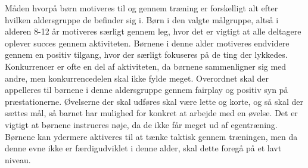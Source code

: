 Måden hvorpå børn motiveres til og gennem træning er forskelligt alt efter hvilken aldersgruppe de befinder sig i. Børn i den valgte målgruppe, altså i alderen 8-12 år motiveres særligt gennem leg, hvor det er vigtigt at alle deltagere oplever succes gennem aktiviteten. Børnene i denne alder motiveres endvidere gennem en positiv tilgang, hvor der særligt fokuseres på de ting der lykkedes. Konkurrencer er ofte en del af aktiviteten, da børnene sammenligner sig med andre, men konkurrencedelen skal ikke fylde meget. Overordnet skal der appelleres til børnene i denne aldersgruppe gennem fairplay og positiv syn på præstationerne. Øvelserne der skal udføres skal være lette og korte, og så skal der sættes mål, så barnet har mulighed for konkret at arbejde med en øvelse. Det er vigtigt at børnene instrueres nøje, da de ikke får meget ud af egentræning. Børnene kan ydermere aktiveres til at tænke taktisk gennem træningen, men da denne evne ikke er færdigudviklet i denne alder, skal dette foregå på et lavt niveau. \citep{Wied2011} 


